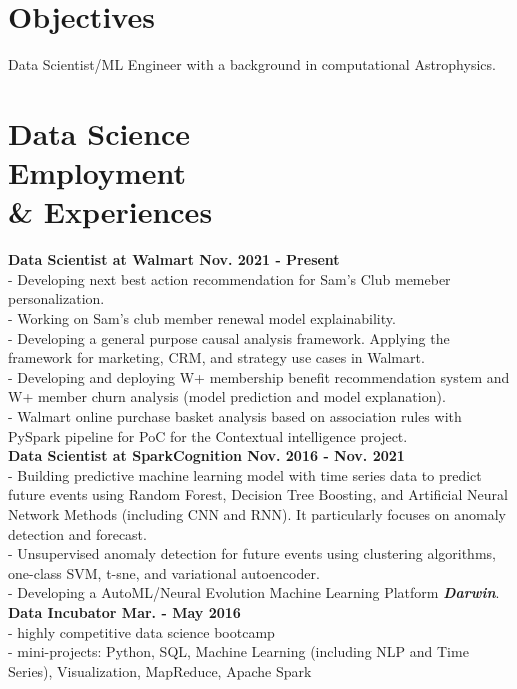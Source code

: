 \documentclass[margin,centered]{res}
\begin{document}
\begin{resume}

\vspace{-0.25cm}
\section{Objectives} Data Scientist/ML Engineer with a background in computational Astrophysics.


\section{Data Science \\ Employment \\ \& Experiences}
{\bf Data Scientist at Walmart Nov. 2021 - Present} \\
- Developing next best action recommendation for Sam's Club memeber personalization. \\
- Working on Sam's club member renewal model explainability. \\
- Developing a general purpose causal analysis framework. Applying the framework for marketing, CRM, and strategy use cases in Walmart. \\
- Developing and deploying W+ membership benefit recommendation system and W+ member churn analysis (model prediction and model explanation).\\
- Walmart online purchase basket analysis based on association rules with PySpark pipeline for PoC for the Contextual intelligence project.\\
{\bf Data Scientist at SparkCognition Nov. 2016 - Nov. 2021} \\
- Building predictive machine learning model with time series data to predict future events using Random Forest, Decision Tree Boosting, and Artificial Neural Network Methods (including CNN and RNN). It particularly focuses on anomaly detection and forecast.\\
- Unsupervised anomaly detection for future events using clustering algorithms, one-class SVM, t-sne, and variational autoencoder. \\
- Developing a AutoML/Neural Evolution Machine Learning Platform {\bf {\it Darwin}}.\\
{\bf Data Incubator Mar. - May 2016}  \\
- highly competitive data science bootcamp \\
- mini-projects: Python, SQL, Machine Learning (including NLP and Time Series), Visualization, MapReduce, Apache Spark \\


\end{resume}
\end{document}
